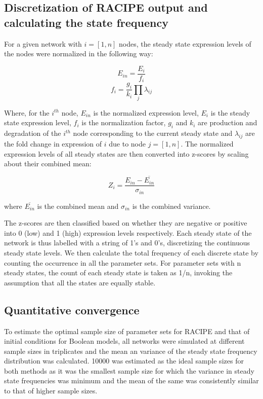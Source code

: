 \documentclass[preprint,review,12pt]{elsarticle}
\begin{document}
	\subsection{Discretization of RACIPE output and calculating the state frequency}

	For a given network with $i = [1,n]$ nodes, the steady state expression levels of the nodes were normalized in the following way:
	
	$$
	E_{in}=\frac{E_i}{f_i} $$
	$$
	f_i=\frac{g_i}{k_i} \prod_j \lambda_{ij} 
	$$
	
	Where, for the $i^{th}$ node, $E_{in}$ is the normalized expression level, $E_i$ is the steady state expression level, $f_i$ is the normalization factor, $g_i$ and $k_i$ are production and degradation of the $i^{th}$ node corresponding to the current steady state and $\lambda_{ij}$ are the fold change in expression of $i$ due to node $j = [1,n]$. The normalized expression levels of all steady states are then converted into z-scores by scaling about their combined mean:
	
	$$Z_i= \frac{E_{in}-\overline{E_{in}}}{\sigma_{in}}$$ 
	
	where $\overline{E_{in}}$ is the combined mean and $\sigma_{in}$ is the combined variance.
	
	The z-scores are then classified based on whether they are negative or positive into 0 (low) and 1 (high) expression levels respectively.
	Each steady state of the network is thus labelled with a string of 1’s and 0’s, discretizing the continuous steady state levels. We then calculate the total frequency of each discrete state by counting the occurrence in all the parameter sets. For parameter sets with n steady states, the count of each steady state is taken as 1/n, invoking the assumption that all the states are equally stable.
	
	\subsection{Quantitative convergence}
	To estimate the optimal sample size of parameter sets for RACIPE and that of initial conditions for Boolean models, all networks were simulated at different sample sizes in triplicates and the mean an variance of the steady state frequency distribution was calculated. 10000 was estimated as the ideal sample sizes for both methods as it was the smallest sample size for which the variance in steady state frequencies was minimum and the mean of the same was consistently similar to that of higher sample sizes. 
	
\end{document}
